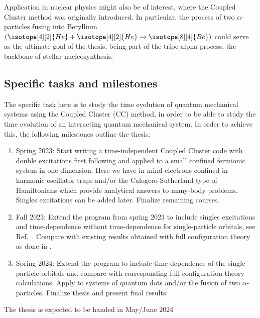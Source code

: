 \documentclass{article}
\begin{document}
Application in nuclear physics might also be of
interest\cite{Pigg2012}, where the Coupled Cluster method was
originally introduced. In particular, the process of two $\alpha$-particles
fusing into Beryllium $(\isotope[4][2]{He} + \isotope[4][2]{He}
\xrightarrow{} \isotope[8][4]{Be})$ could serve as the ultimate goal
of the thesis, being part of the tripe-alpha process, the backbone of
stellar nucleosynthesis.

\subsection*{Specific tasks and milestones}

The specific task here is to study the time evolution of quantum
mechanical systems using the Coupled Cluster (CC) method, in order to
be able to study the time evolution of an interacting quantum
mechanical system. In order to achieve this, the following milestones outline the thesis:

\begin{enumerate}
    \item Spring 2023: Start writing a time-independent Coupled Cluster code with double excitations first following \cite{Lietz2017} and applied to a small confined fermionic system in one dimension. Here we have in mind electrons confined in harmonic oscillator traps \cite{Zanghellini2004} and/or the Calogero-Sutherland \cite{Calogero1971} type of Hamiltonians which provide analytical answers to many-body problems. Singles excitations can be added later. Finalize remaining courses. 
    \item Fall 2023: Extend the program from spring 2023 to include singles excitations and time-dependence without time-dependence for single-particle orbitals, see Ref.~\cite{Pigg2012}. Compare with existing results obtained with full configuration theory as done in \cite{Skattum2013,Hochstuhl2014}.
    \item Spring 2024: Extend the program to include time-dependence of the single-particle orbitals and compare with corresponding full configuration theory calculations. Apply to systems of quantum dots and/or the fusion of two $\alpha$-particles. Finalize thesis and present final results.
\end{enumerate}
The thesis is expected to be handed in May/June 2024
\end{document}
